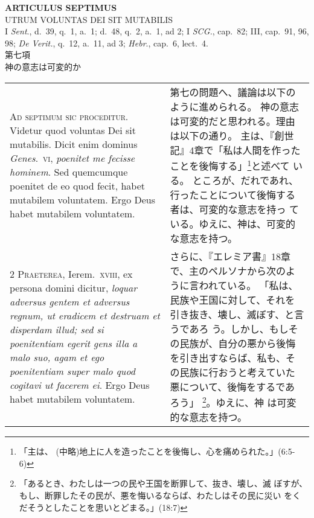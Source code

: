 \documentclass[10pt]{jsarticle} %
\begin{document}
\begin{center}
 {\Large {\bf ARTICULUS SEPTIMUS}}\\
 {\large UTRUM VOLUNTAS DEI SIT MUTABILIS}\\
 {\footnotesize I {\itshape Sent}., d.~39, q.~1, a.~1; d.~48, q.~2,
 a.~1, ad 2; I {\itshape SCG.}, cap.~82; III, cap.~91, 96, 98; {\itshape
 De Verit.}, q.~12, a.~11, ad 3; {\itshape Hebr}., cap.~6, lect.~4.}\\
 {\Large 第七項\\神の意志は可変的か}
\end{center}

\begin{longtable}{p{21em}p{21em}}

{\huge A}{\scshape d septimum sic proceditur}. Videtur quod
 voluntas Dei sit mutabilis. Dicit enim dominus {\itshape Genes}.~{\scshape vi}, {\itshape poenitet me
 fecisse hominem}. Sed quemcumque poenitet de eo quod fecit, habet
 mutabilem voluntatem. Ergo Deus habet mutabilem voluntatem.

&

第七の問題へ、議論は以下のように進められる。
神の意志は可変的だと思われる。理由は以下の通り。
主は、『創世記』4章で「私は人間を作ったことを後悔する」\footnote{「主は、
 (中略)地上に人を造ったことを後悔し、心を痛められた。」(6:5-6)}と述べて
 いる。
ところが、だれであれ、行ったことについて後悔する者は、可変的な意志を持っ
 ている。ゆえに、神は、可変的な意志を持つ。

\\



{\scshape 2 Praeterea}, Ierem.~{\scshape xviii}, ex persona domini
 dicitur, {\itshape loquar adversus gentem et adversus regnum, ut eradicem et
 destruam et disperdam illud; sed si poenitentiam egerit gens illa a
 malo suo, agam et ego poenitentiam super malo quod cogitavi ut facerem
 ei}. Ergo Deus habet mutabilem voluntatem.


&

さらに、『エレミア書』18章で、主のペルソナから次のように言われている。
 「私は、民族や王国に対して、それを引き抜き、壊し、滅ぼす、と言うであろ
 う。しかし、もしその民族が、自分の悪から後悔を引き出すならば、私も、そ
 の民族に行おうと考えていた悪について、後悔をするであろう」
 \footnote{「あるとき、わたしは一つの民や王国を断罪して、抜き、壊し、滅
 ぼすが、もし、断罪したその民が、悪を悔いるならば、わたしはその民に災い
 をくだそうとしたことを思いとどまる。」(18:7)}。ゆえに、神
 は可変的な意志を持つ。


\end{longtable}
\end{document}
